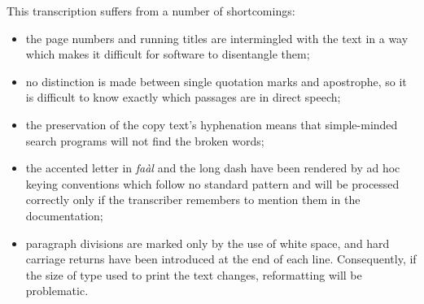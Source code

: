\documentclass[11pt,twoside]{article}\makeatletter
\begin{document}
         \par
This transcription suffers from a number of shortcomings: \begin{itemize}

\item the page numbers and running titles are intermingled with the text in a way which makes it difficult for software to disentangle them;
\item no distinction is made between single quotation marks and apostrophe, so it is difficult to know exactly which passages are in direct speech;
\item the preservation of the copy text's hyphenation means that simple-minded search programs will not find the broken words;
\item the accented letter in \emph{faàl} and the long dash have been rendered by ad hoc keying conventions which follow no standard pattern and will be processed correctly only if the transcriber remembers to mention them in the documentation;
\item paragraph divisions are marked only by the use of white space, and hard carriage returns have been introduced at the end of each line. Consequently, if the size of type used to print the text changes, reformatting will be problematic.
\end{itemize} \par
\end{document}
